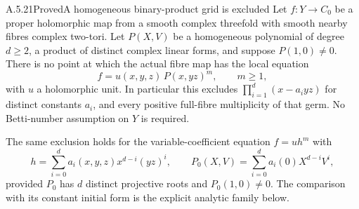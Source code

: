 \begin{statement}{A.5.21}{Proved}{A homogeneous binary-product grid is excluded}
Let $f:Y\to C_0$ be a proper holomorphic map from a smooth
complex threefold with smooth nearby fibres complex
two-tori. Let $P(X,V)$ be a homogeneous polynomial of
degree $d\ge2$, a product of distinct complex linear
forms, and suppose $P(1,0)\ne0$.
There is no point at which the actual fibre map has
the local equation
\[
             f=u(x,y,z)\,P(x,yz)^m,
             \qquad m\ge1,                         \tag{A.BP.1}
\]
with $u$ a holomorphic unit. In particular this excludes
$\prod_{i=1}^d(x-a_i yz)$ for distinct constants $a_i$,
and every positive full-fibre multiplicity of that germ.
No Betti-number assumption on $Y$ is required.

The same exclusion holds for the variable-coefficient
equation $f=u h^m$ with
\[
 h=\sum_{i=0}^d a_i(x,y,z)x^{d-i}(yz)^i,
 \qquad P_0(X,V)=\sum_{i=0}^d a_i(0)X^{d-i}V^i,
                                                        \tag{A.BP.4}
\]
provided $P_0$ has $d$ distinct projective roots and
$P_0(1,0)\ne0$. The comparison with its constant
initial form is the explicit analytic family below.
\end{statement}
